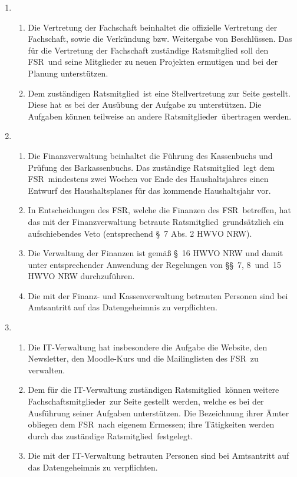 \documentclass[a4paper, 12pt, ngerman]{article}
\newcommand{\rat}{FSR}
\newcommand{\rates}{FSR}
\newcommand{\mitglieder}{Ratsmitglieder}
\newcommand{\mitglied}{Ratsmitglied}
\newcommand{\fsmitglieder}{Fachschaftsmitglieder}
\begin{document}
\begin{enumerate}[leftmargin=0cm]
	\item {}
	
	\begin{enumerate}[leftmargin=0cm]
		\item Die Vertretung der Fachschaft beinhaltet die offizielle Vertretung der Fachschaft, sowie die Verkündung bzw. Weitergabe von Beschlüssen. Das für die Vertretung der Fachschaft zuständige Ratsmitglied soll den \rat~und seine Mitglieder zu neuen Projekten ermutigen und bei der Planung unterstützen.
		\item Dem zuständigen \mitglied~ist eine Stellvertretung zur Seite gestellt. Diese hat es bei der Ausübung der Aufgabe zu unterstützen. Die Aufgaben können teilweise
		an andere \mitglieder~übertragen werden. 
	\end{enumerate}
	
	\item {}
	
	\begin{enumerate}[leftmargin=0cm]
		\item Die Finanzverwaltung beinhaltet die Führung des Kassenbuchs und Prüfung des Barkassenbuchs. Das zuständige \mitglied~legt dem \rat~mindestens zwei Wochen vor Ende des Haushaltsjahres einen Entwurf des Haushaltsplanes für das kommende
		Haushaltsjahr vor.
		\item In Entscheidungen des \rates, welche die Finanzen des \rates~betreffen, hat das mit der Finanzverwaltung betraute \mitglied~grundsätzlich ein aufschiebendes Veto (entsprechend §~7 Abs. 2 HWVO NRW).
		\item Die Verwaltung der Finanzen ist gemäß §~16 HWVO NRW und damit unter entsprechender Anwendung der Regelungen von §§~7, 8~und~15 HWVO NRW durchzuführen.
		\item Die mit der Finanz- und Kassenverwaltung betrauten Personen sind bei Amtsantritt auf das Datengeheimnis zu verpflichten.
	\end{enumerate}	
	
	\item {}
	
	\begin{enumerate}[leftmargin=0cm]
		\item Die IT-Verwaltung hat insbesondere die Aufgabe die Website, den Newsletter, den Moodle-Kurs und die Mailinglisten des \rates~zu verwalten.
		\item Dem für die IT-Verwaltung zuständigen \mitglied~können weitere \fsmitglieder~zur Seite gestellt werden, welche es bei der Ausführung seiner Aufgaben unterstützen. Die Bezeichnung ihrer Ämter obliegen dem \rat~nach eigenem Ermessen; ihre Tätigkeiten werden durch das zuständige \mitglied~festgelegt.		
		\item Die mit der IT-Verwaltung betrauten Personen sind bei Amtsantritt auf das Datengeheimnis zu verpflichten.
	\end{enumerate}
	

\end{enumerate}
\end{document}

